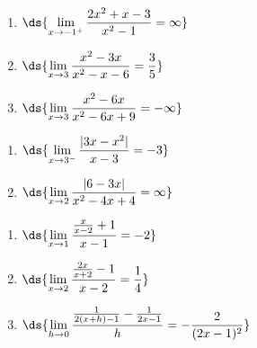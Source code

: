 \documentclass{ximera}
\begin{document}
\begin{enumerate}
\setcounter{enumi}{\value{HW}}

\item   $\ds{\lim_{x \rightarrow -1^{+}} \frac{2x^2+x-3}{x^2-1} = \infty}$

\medskip

\item  $\ds{\lim_{x \rightarrow 3} \frac{x^2-3x}{x^2-x-6} = \frac{3}{5}}$


\medskip

\item  $\ds{\lim_{x \rightarrow 3} \frac{x^2-6x}{x^2-6x+9} = -\infty}$

\medskip

\setcounter{HW}{\value{enumi}}
\end{enumerate}




\begin{enumerate}
\setcounter{enumi}{\value{HW}}

\item  $\ds{ \lim_{x \rightarrow 3^{-}} \frac{|3x - x^2| }{x-3} = -3}$ 

\medskip    

\item $\ds{\lim_{x \rightarrow 2} \frac{|6-3x|}{x^2-4x+4} = \infty}$

\medskip

\setcounter{HW}{\value{enumi}}
\end{enumerate}

\begin{enumerate}
\setcounter{enumi}{\value{HW}}

\item  $\ds{\lim_{x \rightarrow 1} \frac{\frac{x}{x-2} +1}{x-1} = -2}$

\medskip

\item $\ds{ \lim_{x \rightarrow 2} \frac{\frac{2x}{x+2}  -1}{x-2}  = \frac{1}{4}}$ 

\medskip
     
\item $\ds{ \lim_{h \rightarrow 0} \frac{\frac{1}{2(x+h) - 1}  - \frac{1}{2x-1} }{h} = -\frac{2}{(2x-1)^2} }$ 

\medskip

\setcounter{HW}{\value{enumi}}
\end{enumerate}
\end{document}
